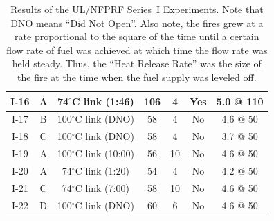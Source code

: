 \begin{table}[h!]
\begin{center}
\begin{tabular}{|c||c|c|c|c|c|c|}
I-16  & A  & 74$^\circ$C link (1:46)    & 106           & 4         & Yes  & 5.0 @ 110 \\ \hline \hline
I-17  & B  & 100$^\circ$C link (DNO)    & 58            & 4         & No   & 4.6 @ 50 \\ \hline
I-18  & C  & 100$^\circ$C link (DNO)    & 58            & 4         & No   & 3.7 @ 50 \\ \hline
I-19  & A  & 100$^\circ$C link (10:00)  & 56            & 10        & No   & 4.6 @ 50 \\ \hline
I-20  & A  & 74$^\circ$C link (1:20)    & 54            & 4         & No   & 4.2 @ 50 \\ \hline
I-21  & C  & 74$^\circ$C link (7:00)    & 58            & 10        & No   & 4.6 @ 50 \\ \hline
I-22  & D  & 100$^\circ$C link (DNO)    & 60            & 6         & No   & 4.6 @ 50 \\ \hline
\end{tabular}
\end{center}
\caption[Results of the UL/NFPRF Experiments, Series~I]
{Results of the UL/NFPRF Series~I Experiments. Note that DNO means
``Did Not Open''. Also note, the fires grew at a rate proportional
to the square of the time until a certain flow rate of fuel was achieved
at which time the flow rate was held steady. Thus, the ``Heat Release Rate''
was the size of the fire at the time when the fuel supply was leveled off.}
\label{ULmatrix}
\end{table}

